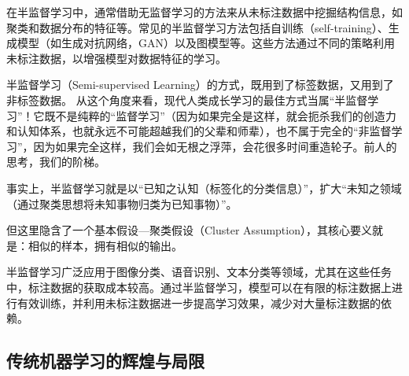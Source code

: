 在半监督学习中，通常借助无监督学习的方法来从未标注数据中挖掘结构信息，如聚类和数据分布的特征等。常见的半监督学习方法包括自训练（self-training）、生成模型（如生成对抗网络，GAN）以及图模型等。这些方法通过不同的策略利用未标注数据，以增强模型对数据特征的学习。

半监督学习（Semi-supervised Learning）的方式，既用到了标签数据，又用到了非标签数据。
从这个角度来看，现代人类成长学习的最佳方式当属“半监督学习”！它既不是纯粹的“监督学习”（因为如果完全是这样，就会扼杀我们的创造力和认知体系，也就永远不可能超越我们的父辈和师辈），也不属于完全的“非监督学习”，因为如果完全这样，我们会如无根之浮萍，会花很多时间重造轮子。前人的思考，我们的阶梯。

事实上，半监督学习就是以“已知之认知（标签化的分类信息）”，扩大“未知之领域（通过聚类思想将未知事物归类为已知事物）”。

但这里隐含了一个基本假设—聚类假设（Cluster Assumption），其核心要义就是：相似的样本，拥有相似的输出。

半监督学习广泛应用于图像分类、语音识别、文本分类等领域，尤其在这些任务中，标注数据的获取成本较高。通过半监督学习，模型可以在有限的标注数据上进行有效训练，并利用未标注数据进一步提高学习效果，减少对大量标注数据的依赖。

\subsection{传统机器学习的辉煌与局限}

 


